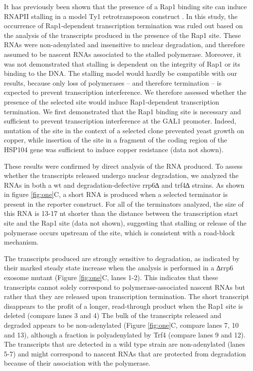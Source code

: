 It has previously been shown that the presence of a Rap1 binding site can induce RNAPII stalling in a model Ty1 retrotransposon construct \cite{yarrington:2012:novel}. In this study, the occurrence of Rap1-dependent transcription termination was ruled out based on the analysis of the transcripts produced in the presence of the Rap1 site. These RNAs were non-adenylated and insensitive to nuclear degradation, and therefore assumed to be nascent RNAs associated to the stalled polymerase. Moreover, it was not demonstrated that stalling is dependent on the integrity of Rap1 or its binding to the DNA.
The stalling model would hardly be compatible with our results, because only loss of polymerases – and therefore termination – is expected to prevent transcription interference. We therefore assessed whether the presence of the selected site would induce Rap1-dependent transcription termination. We first demonstrated that the Rap1 binding site is necessary and sufficient to prevent transcription interference at the GAL1 promoter. Indeed, mutation of the site in the context of a selected clone prevented yeast growth on copper, while insertion of the site in a fragment of the coding region of the HSP104 gene was sufficient to induce copper resistance (data not shown).  


These results were confirmed by direct analysis of the RNA produced. To assess whether the transcripts released undergo nuclear degradation, we analyzed the RNAs in both a wt and degradation-defective rrp6∆ and trf4∆ strains. As shown in figure \ref{fig:one}C, a short RNA is produced when a selected terminator is present in the reporter construct. For all of the terminators analyzed, the size of this RNA is 13-17 nt shorter than the distance between the transcription start site and the Rap1 site (data not shown), suggesting that stalling or release of the polymerase occurs upstream of the site, which is consistent with a road-block mechanism. 

The transcripts produced are strongly sensitive to degradation, as indicated by their marked steady state increase when the analysis is performed in a ∆rrp6 exosome mutant (Figure \ref{fig:one}C, lanes 1-2). This indicates that these transcripts cannot solely correspond to polymerase-associated nascent RNAs but rather that they are released upon transcription termination. The short transcript disappears to the profit of a longer, read-through product when the Rap1 site is deleted (compare lanes 3 and 4) The bulk of the transcripts released and degraded appears to be non-adenylated (Figure \ref{fig:one}C, compare lanes 7, 10 and 13), although a fraction is polyadenylated by Trf4 (compare lanes 9 and 12). The transcripts that are detected in a wild type strain are non-adenylated (lanes 5-7) and might correspond to nascent RNAs that are protected from degradation because of their association with the polymerase.


